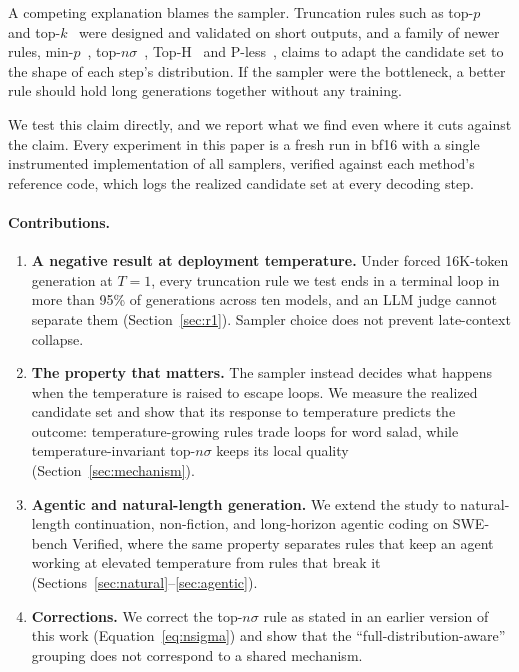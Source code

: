 \documentclass{article}
\begin{document}
A competing explanation blames the sampler. Truncation rules such as top-$p$~\citep{holtzman2020curious} and top-$k$~\citep{fan2018hierarchical} were designed and validated on short outputs, and a family of newer rules, min-$p$~\citep{nguyen2024minp}, top-$n\sigma$~\citep{tang2024topnsigma}, Top-H~\citep{baghaei2025toph} and P-less~\citep{tan2025pless}, claims to adapt the candidate set to the shape of each step's distribution. If the sampler were the bottleneck, a better rule should hold long generations together without any training.

We test this claim directly, and we report what we find even where it cuts against the claim. Every experiment in this paper is a fresh run in bf16 with a single instrumented implementation of all samplers, verified against each method's reference code, which logs the realized candidate set at every decoding step.

\paragraph{Contributions.}
\begin{enumerate}[leftmargin=*,nosep]
\item \textbf{A negative result at deployment temperature.} Under forced 16K-token generation at $T{=}1$, every truncation rule we test ends in a terminal loop in more than 95\% of generations across ten models, and an LLM judge cannot separate them (Section~\ref{sec:r1}). Sampler choice does not prevent late-context collapse.
\item \textbf{The property that matters.} The sampler instead decides what happens when the temperature is raised to escape loops. We measure the realized candidate set and show that its response to temperature predicts the outcome: temperature-growing rules trade loops for word salad, while temperature-invariant top-$n\sigma$ keeps its local quality (Section~\ref{sec:mechanism}).
\item \textbf{Agentic and natural-length generation.} We extend the study to natural-length continuation, non-fiction, and long-horizon agentic coding on SWE-bench Verified, where the same property separates rules that keep an agent working at elevated temperature from rules that break it (Sections~\ref{sec:natural}--\ref{sec:agentic}).
\item \textbf{Corrections.} We correct the top-$n\sigma$ rule as stated in an earlier version of this work (Equation~\ref{eq:nsigma}) and show that the ``full-distribution-aware'' grouping does not correspond to a shared mechanism.
\end{enumerate}
\end{document}
